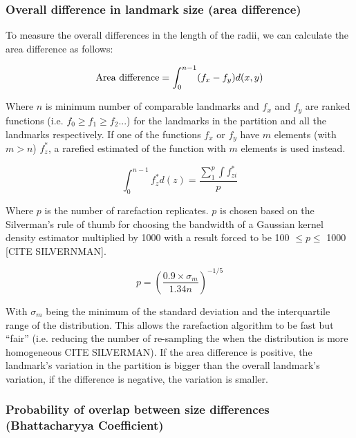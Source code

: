 \documentclass[a4paper,11pt]{article}
\begin{document}
\subsubsection{Overall difference in landmark size (area difference)}

To measure the overall differences in the length of the radii, we can calculate the area difference as follows:

\begin{equation}
\label{area_diff}
    \textnormal{Area difference} = \int_{0}^{n-1} (f_{x} - f_{y})d(x,y)
\end{equation}

\noindent Where $n$ is minimum number of comparable landmarks and $f_{x}$ and $f_{y}$ are ranked functions (i.e. $f_{0} \geq f_{1} \geq f_{2} ...$) for the landmarks in the partition and all the landmarks respectively.
If one of the functions $f_{x}$ or $f_{y}$ have $m$ elements (with $m > n$) $f^{*}_{z}$, a rarefied estimated of the function with $m$ elements is used instead.

\begin{equation}
\label{are_estimation}
    \int_{0}^{n-1}f^*_{z}d(z) = \frac{\sum_1^p\int f^*_{zi}}{p}
\end{equation}

\noindent Where $p$ is the number of rarefaction replicates.
$p$ is chosen based on the Silverman's rule of thumb for choosing the bandwidth of a Gaussian kernel density estimator multiplied by 1000 with a result forced to be 100 $\leq p \leq$ 1000 [CITE SILVERNMAN].

\begin{equation}
\label{Silverman_rule}
    p=\left(\frac{0.9\times \sigma_{m} }{1.34n}\right)^{-1/5}
\end{equation}

\noindent With $\sigma_{m}$ being the minimum of the standard deviation and the interquartile range of the distribution.
This allows the rarefaction algorithm to be fast but ``fair'' (i.e. reducing the number of re-sampling the when the distribution is more homogeneous CITE SILVERMAN).
If the area difference is positive, the landmark's variation in the partition is bigger than the overall landmark's variation, if the difference is negative, the variation is smaller.


\subsubsection{Probability of overlap between size differences (Bhattacharyya Coefficient)}
\end{document}
